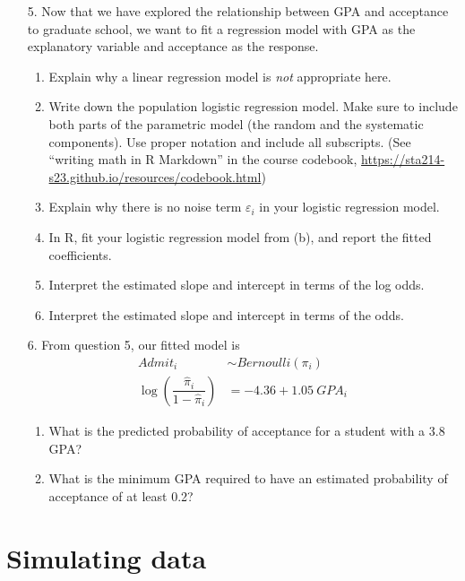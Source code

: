 \documentclass[11pt]{article}
\begin{document}
\begin{enumerate}
\item[5.] Now that we have explored the relationship between GPA and acceptance to graduate school, we want to fit a regression model with GPA as the explanatory variable and acceptance as the response.

\begin{enumerate}
\item Explain why a linear regression model is \textit{not} appropriate here.

\item Write down the population logistic regression model. Make sure to include both parts of the parametric model (the random and the systematic components). Use proper notation and include all subscripts. (See ``writing math in R Markdown'' in the course codebook, \url{https://sta214-s23.github.io/resources/codebook.html})

\item Explain why there is no noise term $\varepsilon_i$ in your logistic regression model.

\item In R, fit your logistic regression model from (b), and report the fitted coefficients.

\item Interpret the estimated slope and intercept in terms of the log odds.

\item Interpret the estimated slope and intercept in terms of the odds.
\end{enumerate}

\item[6.] From question 5, our fitted model is
\begin{align*}
Admit_i &\sim Bernoulli(\pi_i) \\
\log \left( \dfrac{\widehat{\pi}_i}{1 - \widehat{\pi}_i} \right) &= -4.36 + 1.05 \ GPA_i
\end{align*}

\begin{enumerate}
\item What is the predicted probability of acceptance for a student with a 3.8 GPA?

\item What is the minimum GPA required to have an estimated probability of acceptance of at least 0.2?
\end{enumerate}
\end{enumerate}

\section{Simulating data}
\end{document}
